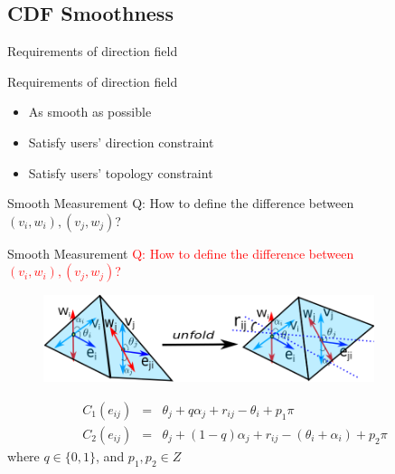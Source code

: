 \documentclass{beamer}
\begin{document}
\subsection{CDF Smoothness}
\begin{frame}{Requirements of direction field}
\end{frame}


\begin{frame}{Requirements of direction field}
\begin{itemize}
\item As smooth as possible
\item Satisfy users' direction constraint
\item Satisfy users' topology constraint
\end{itemize}
\end{frame}

\begin{frame}{Smooth Measurement}
Q: How to define the difference between $(v_i,w_i),(v_j,w_j)$?
\end{frame}


\begin{frame}{Smooth Measurement}
\textcolor{red}{Q: How to define the difference between $(v_i,w_i),(v_j,w_j)$?}
\begin{figure}[!htb]
\includegraphics[height=1.0in]{./img/twoframe-unfold.png}
\end{figure}
\begin{eqnarray*}
C_1(e_{ij}) &=& \theta_j + q\alpha_j + r_{ij}-\theta_i+p_1\pi\\
C_2(e_{ij}) &=& \theta_j + (1-q)\alpha_j + r_{ij}-(\theta_i+\alpha_i)+p_2\pi
\end{eqnarray*}
where $q\in\{0,1\}$, and $p_1,p_2\in Z$
\end{frame}
\end{document}
